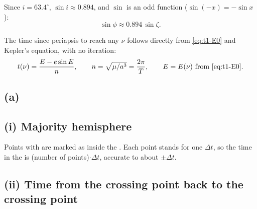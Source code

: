 \begin{newpar}
\noindent Since $i = 63.4^\circ$, $\sin i \approx 0.894$, and $\sin$ is an odd function ($\sin(-x) = -\sin x$):
\begin{equation}
\sin\phi \approx 0.894\,\sin\zeta.
\end{equation}

The time since periapsis to reach any $\nu$ follows directly from \cref{eq:t1-E0} and Kepler's equation, with no iteration:
\begin{equation}
t(\nu) = \frac{E - e\sin E}{n}, \qquad n = \sqrt{\mu/a^3} = \frac{2\pi}{T}, \qquad E = E(\nu) \text{ from \cref{eq:t1-E0}}.
\label{eq:t3-tnu}
\end{equation}
\end{newpar}

\subsection*{(a)}
\subsection*{(i) Majority hemisphere}

Points with  are marked as inside the . Each point stands for one $\Delta t$, so the time in the  is (number of points)$\cdot\Delta t$, accurate to about $\pm\Delta t$. 

\subsection*{(ii) Time from the crossing point back to the crossing point}

